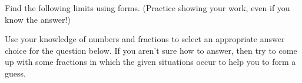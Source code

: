 \documentclass[10pt]{article}
\begin{document}
 Find the following limits using forms. (Practice showing your work, even if you know the answer!) \\

\vfill


\lform  {}


 Use your knowledge of numbers and fractions to select an appropriate answer choice for the question below. If you aren't sure how to answer, then try to come up with some fractions in which the given situations occur to help you to form a guess.\\
\end{document}
